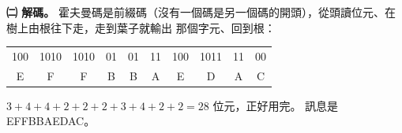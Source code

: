 \begin{pastsoln}
\textbf{㈡ 解碼。} 霍夫曼碼是前綴碼（沒有一個碼是另一個碼的開頭），從頭讀位元、在樹上由根往下走，走到葉子就輸出
那個字元、回到根：
\begin{center}
\begin{tabular}{cccccccccc}
\toprule
100 & 1010 & 1010 & 01 & 01 & 11 & 100 & 1011 & 11 & 00 \\
E & F & F & B & B & A & E & D & A & C \\
\bottomrule
\end{tabular}
\end{center}
$3 + 4 + 4 + 2 + 2 + 2 + 3 + 4 + 2 + 2 = 28$ 位元，正好用完。 訊息是 EFFBBAEDAC。
\end{pastsoln}
